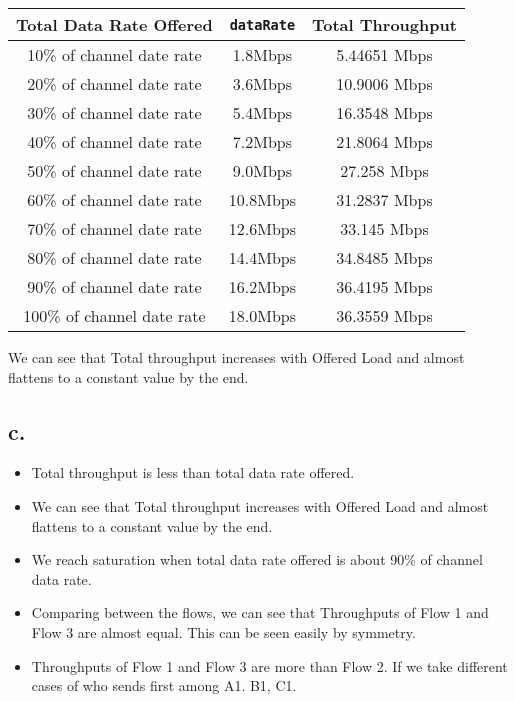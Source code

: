 \documentclass[11pt, fleqn]{article}
\begin{document}
\begin{table}[H]
    \centering
    \begin{tabular}{||c|c||c||}
         \hline
         Total Data Rate Offered & \texttt{dataRate} & Total Throughput \\
         \hline %
         10\% of channel date rate & 1.8Mbps & 5.44651 Mbps \\
         \hline %
         20\% of channel date rate & 3.6Mbps & 10.9006 Mbps \\
         \hline %
         30\% of channel date rate & 5.4Mbps & 16.3548 Mbps \\
         \hline %
         40\% of channel date rate & 7.2Mbps & 21.8064 Mbps \\
         \hline %
         50\% of channel date rate & 9.0Mbps & 27.258 Mbps \\
         \hline %
         60\% of channel date rate & 10.8Mbps & 31.2837 Mbps \\
         \hline %
         70\% of channel date rate & 12.6Mbps & 33.145 Mbps \\
         \hline %
         80\% of channel date rate & 14.4Mbps & 34.8485 Mbps \\
         \hline %
         90\% of channel date rate & 16.2Mbps & 36.4195 Mbps \\
         \hline %
         100\% of channel date rate & 18.0Mbps & 36.3559 Mbps \\
         \hline         
    \end{tabular}
\end{table}

We can see that Total throughput increases with Offered Load and almost flattens to a constant value by the end. \\

\subsection*{c.}

\begin{itemize}
    \item Total throughput is less than total data rate offered.
    \item We can see that Total throughput increases with Offered Load and almost flattens to a constant value by the end.
    \item We reach saturation when total data rate offered is about 90\% of channel data rate.
    \item Comparing between the flows, we can see that Throughputs of Flow 1 and Flow 3 are almost equal. This can be seen easily by symmetry.
    \item Throughputs of Flow 1 and Flow 3 are more than Flow 2. If we take different cases of who sends first among A1. B1, C1.
\end{itemize}
\end{document}
